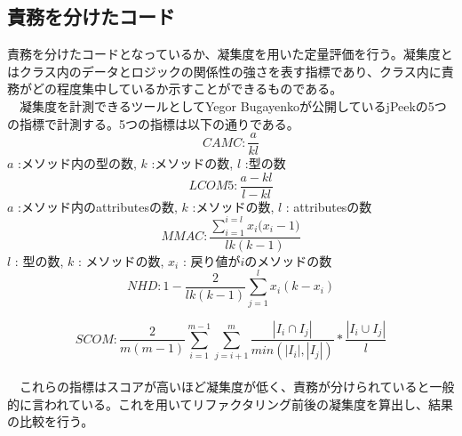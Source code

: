 \documentclass[12pt, a4paper]{jreport}
\begin{document}
\subsection{責務を分けたコード}
責務を分けたコードとなっているか、凝集度を用いた定量評価を行う。凝集度とはクラス内のデータとロジックの関係性の強さを表す指標であり、クラス内に責務がどの程度集中しているか示すことができるものである。
\\　凝集度を計測できるツールとしてYegor Bugayenkoが公開しているjPeekの5つの指標で計測する。5つの指標は以下の通りである。
\\
\begin{equation}
CAMC:
\frac{a}{kl}
\end{equation}
$a$ :メソッド内の型の数, $k$ :メソッドの数, $l$ :型の数
\begin{equation}
LCOM5:
\frac{a-kl}{l-kl}
\end{equation}
$a$ :メソッド内のattributesの数, $k$ :メソッドの数, $l$ : attributesの数
\begin{equation}
MMAC:
\frac{\sum^{i=l}_{i=1}{{x}_{i}{({x}_{i}-1})}}{lk(k-1)}
\end{equation}
$l$ : 型の数, $k$ : メソッドの数, ${x}_{i}$ : 戻り値が${i}$のメソッドの数
\begin{equation}
NHD:
1-\frac{2}{lk(k-1)}\sum^{l}_{j=1}{x}_{i}{(k-{x}_{i})}
\end{equation}

\begin{equation}
SCOM:
\frac{2}{m(m-1)}\sum^{m-1}_{i=1}\sum^{m}_{j=i+1}\frac{|{I}_{i}\cap{I}_{j}|}{min(|{I}_{i}|,|{I}_{j}|)}*\frac{|{I}_{i}\cup{I}_{j}|}{l}
\end{equation}
\\　これらの指標はスコアが高いほど凝集度が低く、責務が分けられていると一般的に言われている。これを用いてリファクタリング前後の凝集度を算出し、結果の比較を行う。
\end{document}

